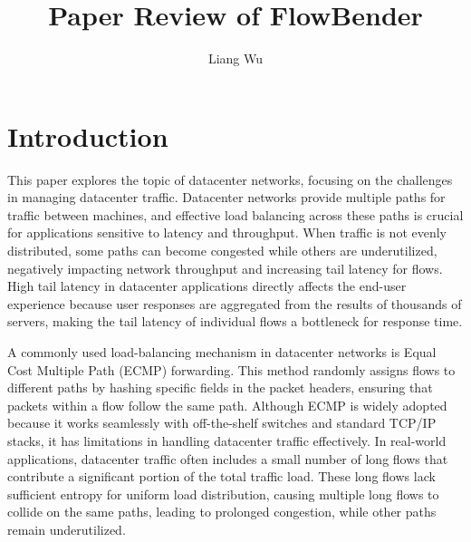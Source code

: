 \documentclass[11pt, sigplan]{acmart}
\begin{document}
\title{Paper Review of FlowBender}

\author{Liang Wu}
\authornotemark[1]

\maketitle

\section{Introduction}
This paper explores the topic of datacenter networks, focusing on the challenges in managing datacenter traffic. Datacenter networks provide multiple paths for traffic between machines, and effective load balancing across these paths is crucial for applications sensitive to latency and throughput. When traffic is not evenly distributed, some paths can become congested while others are underutilized, negatively impacting network throughput and increasing tail latency for flows. High tail latency in datacenter applications directly affects the end-user experience because user responses are aggregated from the results of thousands of servers, making the tail latency of individual flows a bottleneck for response time.

A commonly used load-balancing mechanism in datacenter networks is Equal Cost Multiple Path (ECMP) forwarding. This method randomly assigns flows to different paths by hashing specific fields in the packet headers, ensuring that packets within a flow follow the same path. Although ECMP is widely adopted because it works seamlessly with off-the-shelf switches and standard TCP/IP stacks, it has limitations in handling datacenter traffic effectively. In real-world applications, datacenter traffic often includes a small number of long flows that contribute a significant portion of the total traffic load. These long flows lack sufficient entropy for uniform load distribution, causing multiple long flows to collide on the same paths, leading to prolonged congestion, while other paths remain underutilized.
\end{document}
